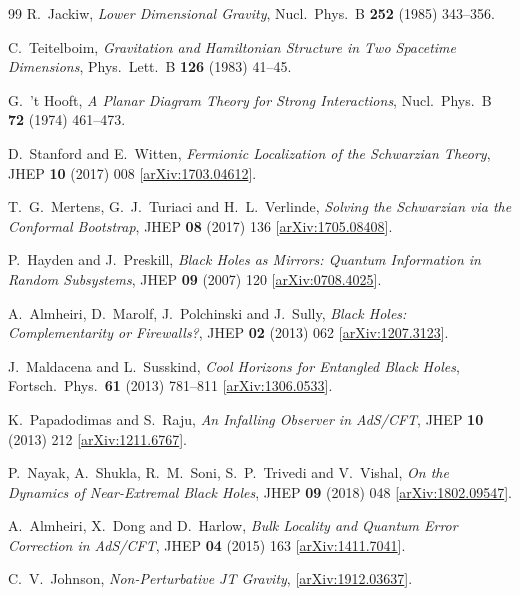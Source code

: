\documentclass[12pt,a4paper]{article}
\begin{document}
\begin{thebibliography}{99}
R.~Jackiw,
\textit{Lower Dimensional Gravity},
Nucl.\ Phys.\ B \textbf{252} (1985) 343--356.

C.~Teitelboim,
\textit{Gravitation and Hamiltonian Structure in Two Spacetime Dimensions},
Phys.\ Lett.\ B \textbf{126} (1983) 41--45.

G.~'t Hooft,
\textit{A Planar Diagram Theory for Strong Interactions},
Nucl.\ Phys.\ B \textbf{72} (1974) 461--473.

D.~Stanford and E.~Witten,
\textit{Fermionic Localization of the Schwarzian Theory},
JHEP \textbf{10} (2017) 008
[\href{https://arxiv.org/abs/1703.04612}{arXiv:1703.04612}].

T.~G.~Mertens, G.~J.~Turiaci and H.~L.~Verlinde,
\textit{Solving the Schwarzian via the Conformal Bootstrap},
JHEP \textbf{08} (2017) 136
[\href{https://arxiv.org/abs/1705.08408}{arXiv:1705.08408}].

P.~Hayden and J.~Preskill,
\textit{Black Holes as Mirrors: Quantum Information in Random Subsystems},
JHEP \textbf{09} (2007) 120
[\href{https://arxiv.org/abs/0708.4025}{arXiv:0708.4025}].

A.~Almheiri, D.~Marolf, J.~Polchinski and J.~Sully,
\textit{Black Holes: Complementarity or Firewalls?},
JHEP \textbf{02} (2013) 062
[\href{https://arxiv.org/abs/1207.3123}{arXiv:1207.3123}].

J.~Maldacena and L.~Susskind,
\textit{Cool Horizons for Entangled Black Holes},
Fortsch.\ Phys.\ \textbf{61} (2013) 781--811
[\href{https://arxiv.org/abs/1306.0533}{arXiv:1306.0533}].

K.~Papadodimas and S.~Raju,
\textit{An Infalling Observer in AdS/CFT},
JHEP \textbf{10} (2013) 212
[\href{https://arxiv.org/abs/1211.6767}{arXiv:1211.6767}].

P.~Nayak, A.~Shukla, R.~M.~Soni, S.~P.~Trivedi and V.~Vishal,
\textit{On the Dynamics of Near-Extremal Black Holes},
JHEP \textbf{09} (2018) 048
[\href{https://arxiv.org/abs/1802.09547}{arXiv:1802.09547}].

A.~Almheiri, X.~Dong and D.~Harlow,
\textit{Bulk Locality and Quantum Error Correction in AdS/CFT},
JHEP \textbf{04} (2015) 163
[\href{https://arxiv.org/abs/1411.7041}{arXiv:1411.7041}].

C.~V.~Johnson,
\textit{Non-Perturbative JT Gravity},
[\href{https://arxiv.org/abs/1912.03637}{arXiv:1912.03637}].

\end{thebibliography}
\end{document}
